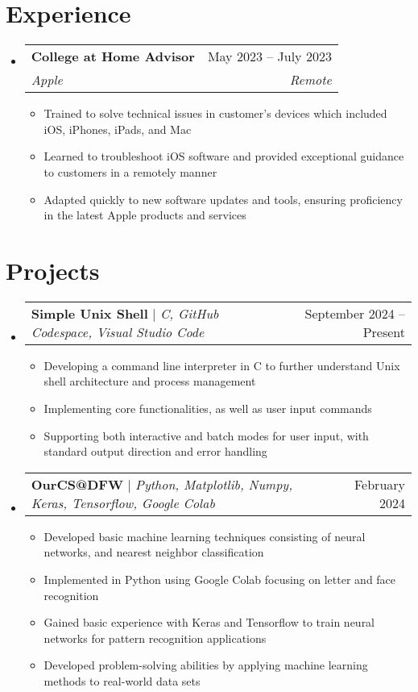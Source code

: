 \documentclass[letterpaper,11pt]{article}
\makeatletter
\newcommand{\resumeItem}[1]{
  \item\small{
    {#1 \vspace{-2pt}}
  }
}
\newcommand{\resumeSubheading}[4]{
  \vspace{-2pt}\item
    \begin{tabular*}{0.97\textwidth}[t]{l@{\extracolsep{\fill}}r}
      \textbf{#1} & #2 \\
      \textit{\small#3} & \textit{\small #4} \\
    \end{tabular*}\vspace{-7pt}
}
\newcommand{\resumeSubSubheading}[2]{
    \item
    \begin{tabular*}{0.97\textwidth}{l@{\extracolsep{\fill}}r}
      \textit{\small#1} & \textit{\small #2} \\
    \end{tabular*}\vspace{-7pt}
}
\newcommand{\resumeProjectHeading}[2]{
    \item
    \begin{tabular*}{0.97\textwidth}{l@{\extracolsep{\fill}}r}
      \small#1 & #2 \\
    \end{tabular*}\vspace{-7pt}
}
\newcommand{\resumeSubHeadingListStart}{\begin{itemize}[leftmargin=0.15in, label={}]}
\newcommand{\resumeSubHeadingListEnd}{\end{itemize}}
\newcommand{\resumeItemListStart}{\begin{itemize}}
\newcommand{\resumeItemListEnd}{\end{itemize}\vspace{-5pt}}
\makeatother
\begin{document}
\section{Experience}
  \resumeSubHeadingListStart

    \resumeSubheading
      {College at Home Advisor}{May 2023 -- July 2023}
      {Apple}{Remote}
      \resumeItemListStart
        \resumeItem{Trained to solve technical issues in customer's devices which included iOS, iPhones, iPads, and Mac}
        \resumeItem{Learned to troubleshoot iOS software and provided exceptional guidance to customers in a remotely manner}
        \resumeItem{Adapted quickly to new software updates and tools, ensuring proficiency in the latest Apple products and services}
        \resumeItemListEnd
      

  \resumeSubHeadingListEnd


\section{Projects}

\resumeSubHeadingListStart
\resumeProjectHeading
    {\textbf{Simple Unix Shell} $|$ \emph{C, GitHub Codespace, Visual Studio Code}}{September 2024 -- Present}
    \resumeItemListStart
      \resumeItem{Developing a command line interpreter in C to further understand Unix shell architecture and process management}
      \resumeItem{Implementing core functionalities, as well as user input commands}
      \resumeItem{Supporting both interactive and batch modes for user input, with standard output direction and error handling}
    \resumeItemListEnd
\resumeSubHeadingListEnd

    \resumeSubHeadingListStart
      \resumeProjectHeading
          {\textbf{OurCS@DFW} $|$ \emph{Python, Matplotlib, Numpy, Keras, Tensorflow, Google Colab}}{February 2024}
          \resumeItemListStart
            \resumeItem{Developed basic machine learning techniques consisting of neural networks, and nearest neighbor classification}
            \resumeItem{Implemented in Python using Google Colab focusing on letter and face recognition}
            \resumeItem{Gained basic experience with Keras and Tensorflow to train neural networks for pattern recognition applications}
            \resumeItem{Developed problem-solving abilities by applying machine learning methods to real-world data sets}
          \resumeItemListEnd
    \resumeSubHeadingListEnd
\end{document}
